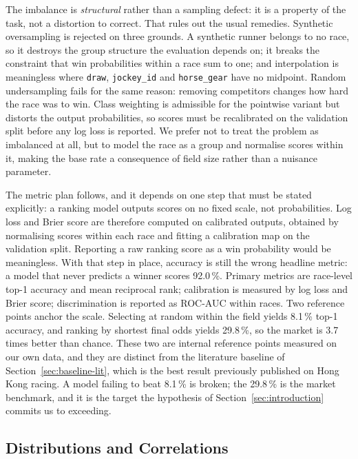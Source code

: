 The imbalance is \emph{structural} rather than a sampling defect: it is a
property of the task, not a distortion to correct. That rules out the
usual remedies. Synthetic oversampling is rejected on three grounds. A
synthetic runner belongs to no race, so it destroys the group structure
the evaluation depends on; it breaks the constraint that win probabilities
within a race sum to one; and interpolation is meaningless where
\texttt{draw}, \texttt{jockey\_id} and \texttt{horse\_gear} have no
midpoint. Random undersampling fails for the same reason: removing
competitors changes how hard the race was to win. Class weighting is
admissible for the pointwise variant but distorts the output
probabilities, so scores must be recalibrated on the validation split
before any log loss is reported. We prefer not to treat the problem as
imbalanced at all, but to model the race as a group and normalise scores
within it, making the base rate a consequence of field size rather than a
nuisance parameter.

The metric plan follows, and it depends on one step that must be stated
explicitly: a ranking model outputs scores on no fixed scale, not
probabilities. Log loss and Brier score are therefore computed on
calibrated outputs, obtained by normalising scores within each race and
fitting a calibration map on the validation split. Reporting a raw ranking
score as a win probability would be meaningless. With that step in place,
accuracy is still the wrong headline metric: a model that never predicts a
winner scores 92.0\,\%. Primary metrics are race-level top-1
accuracy and mean reciprocal rank; calibration is measured by log loss and
Brier score; discrimination is reported as ROC-AUC within races. Two
reference points anchor the scale. Selecting at random within the field
yields 8.1\,\% top-1 accuracy, and ranking by shortest final odds yields
29.8\,\%, so the market is 3.7 times better than chance. These two are
internal reference points measured on our own data, and they are distinct
from the literature baseline of Section~\ref{sec:baseline-lit}, which is
the best result previously published on Hong Kong racing. A model failing
to beat 8.1\,\% is broken; the 29.8\,\% is the market benchmark, and it is
the target the hypothesis of Section~\ref{sec:introduction} commits us to
exceeding.

\subsection{Distributions and Correlations}
\label{sec:distributions}

